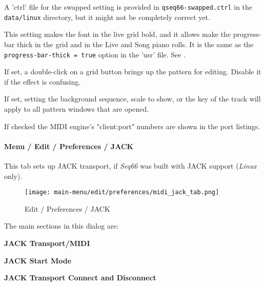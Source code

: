    A 'ctrl' file for the swapped setting is provided
   in \texttt{qseq66-swapped.ctrl} in the \texttt{data/linux}
   directory, but it might not be completely correct yet.

   This setting makes the font in the live grid bold, and it allows
   make the progress-bar thick in the grid and in the Live and Song piano
   rolls.
   It is the same as the \texttt{progress-bar-thick = true} option in the 'usr'
   file. See .

   If set, a double-click on a grid button brings up the pattern for editing.
   Disable it if the effect is confusing.

   If set, setting the background sequence, scale to show, or the key of the
   track will apply to all pattern windows that are opened.

   If checked the MIDI engine's "client:port" numbers are shown in the port
   listings.
 
\paragraph{Menu / Edit / Preferences / JACK}
\label{paragraph:menu_edit_preferences_jack}

   This tab sets up JACK transport, if \textsl{Seq66}
   was built with JACK support (\textsl{Linux} only).

\begin{figure}[H]
   \centering 
   \texttt{[image: main-menu/edit/preferences/midi\_jack\_tab.png]}
   \caption{Edit / Preferences / JACK}
   \label{fig:midi_jack_tab}
\end{figure}

   The main sections in this dialog are:

   \begin{enumber}
      \item \textbf{JACK Transport/MIDI}
      \item \textbf{JACK Start Mode}
      \item \textbf{JACK Transport Connect and Disconnect}
   \end{enumber}

